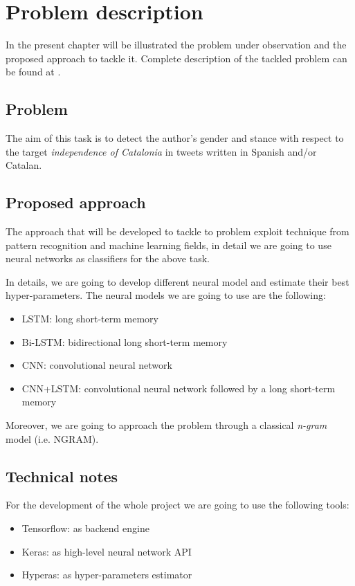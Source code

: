 \chapter{Problem description} \label{chapter:problem}

In the present chapter will be illustrated the problem under observation and the proposed approach to tackle it. Complete description of the tackled problem can be found at \cite{STANCE}.

\section{Problem}

The aim of this task is to detect the author's gender and stance with respect to the target \emph{independence of Catalonia} in tweets written in Spanish and/or Catalan.


\section{Proposed approach}

The approach that will be developed to tackle to problem exploit technique from pattern recognition and machine learning fields, in detail we are going to use neural networks as classifiers for the above task.

In details, we are going to develop different neural model and estimate their best hyper-parameters. The neural models we are going to use are the following:
\begin{itemize}
\item LSTM: long short-term memory
\item Bi-LSTM: bidirectional long short-term memory
\item CNN: convolutional neural network
\item CNN+LSTM: convolutional neural network followed by a long short-term memory
\end{itemize}
Moreover, we are going to approach the problem through a classical \emph{n-gram} model (i.e. NGRAM).

\section{Technical notes}

For the development of the whole project we are going to use the following tools:

\begin{itemize}
\item Tensorflow: as backend engine
\item Keras: as high-level neural network API
\item Hyperas: as hyper-parameters estimator
\end{itemize}

